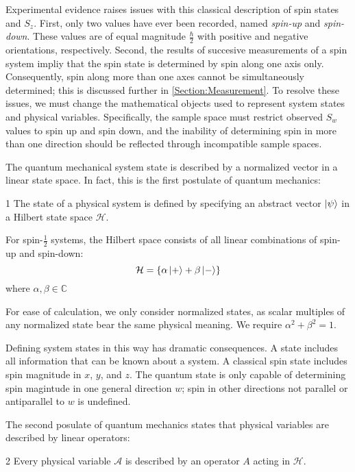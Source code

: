 Experimental evidence raises issues with this classical description of spin states and $S_z$. First, only two values have ever been recorded, named \textit{spin-up} and \textit{spin-down}. These values are of equal magnitude $\frac{\hbar}{2}$ with positive and negative orientations, respectively. Second, the results of succesive measurements of a spin system impliy that the spin state is determined by spin along one axis only. Consequently, spin along more than one axes cannot be simultaneously determined; this is discussed further in \ref{Section:Measurement}. To resolve these issues, we must change the mathematical objects used to represent system states and physical variables. Specifically, the sample space must restrict observed $S_w$ values to spin up and spin down, and the inability of determining spin in more than one direction should be reflected through incompatible sample spaces.

The quantum mechanical system state is described by a normalized vector in a linear state space. In fact, this is the first postulate of quantum mechanics:
\begin{Thm:Postulate}{1}
    The state of a physical system is defined by specifying an abstract vector $\ket{\psi}$ in a Hilbert state space $\mathcal{H}$.
\end{Thm:Postulate}

For spin-$\frac{1}{2}$ systems, the Hilbert space consists of all linear combinations of spin-up and spin-down:
\begin{equation}
    \mathcal{H} = \{\alpha\ket{+} + \beta\ket{-}\}
\end{equation}
where $\alpha, \beta \in \mathbb{C}$

For ease of calculation, we only consider normalized states, as scalar multiples of any normalized state bear the same physical meaning. We require $\alpha^2 + \beta^2 = 1$.

Defining system states in this way has dramatic consequences. A state includes all information that can be known about a system. A classical spin state includes spin magnitude in $x$, $y$, and $z$. The quantum state is only capable of determining spin magintude in one general direction $w$; spin in other directions not parallel or antiparallel to $w$ is undefined.

The second posulate of quantum mechanics states that physical variables are described by linear operators:
\begin{Thm:Postulate}{2}
    Every physical variable $\mathcal{A}$ is described by an operator $A$ acting in $\mathcal{H}$.
\end{Thm:Postulate}

